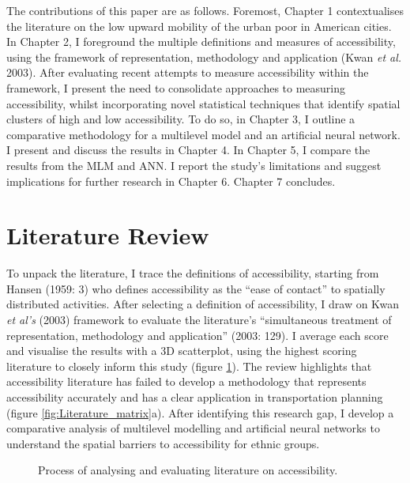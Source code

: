 \documentclass[a4paper,UKenglish]{lipics-v2018}
\begin{document}
The contributions of this paper are as follows. Foremost, Chapter 1 contextualises the literature on the low upward mobility of the urban poor in American cities. In Chapter 2, I foreground the multiple definitions and measures of accessibility, using the framework of representation, methodology and application (Kwan \textit{et al.} 2003). After evaluating recent attempts to measure accessibility within the framework, I present the need to consolidate approaches to measuring accessibility, whilst incorporating novel statistical techniques that identify spatial clusters of high and low accessibility. To do so, in Chapter 3, I outline a comparative methodology for a multilevel model and an artificial neural network. I present and discuss the results in Chapter 4. In Chapter 5, I compare the results from the MLM and ANN. I report the study’s limitations and suggest implications for further research in Chapter 6. Chapter 7 concludes. 
\newpage

\section{Literature Review}
\label{sec:motivation}
To unpack the literature, I trace the definitions of accessibility, starting from Hansen (1959: 3) who defines accessibility as the “ease of contact” to spatially distributed activities. After selecting a definition of accessibility, I draw on Kwan \textit{et al's} (2003) framework to evaluate the literature's “simultaneous treatment of representation, methodology and application” (2003: 129). I average each score and visualise the results with a 3D scatterplot, using the highest scoring literature to closely inform this study (figure \ref{fig:Literature_Analysis}). The review highlights that accessibility literature has failed to develop a methodology that represents accessibility accurately and has a clear application in transportation planning (figure \ref{fig:Literature_matrix}a). After identifying this research gap, I develop a comparative analysis of multilevel modelling and artificial neural networks to understand the spatial barriers to accessibility for ethnic groups. 

\begin{figure}[H]
    \centering
    \caption[Literature Analysis Methodology]{Process of analysing and evaluating literature on accessibility.} 
    \label{fig:Literature_Analysis}
\end{figure}
\end{document}
